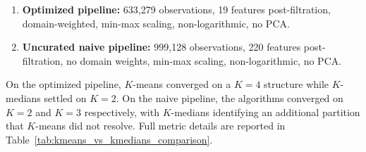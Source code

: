 \begin{enumerate}
    \item \textbf{Optimized pipeline:} 633,279 observations, 19 features post-filtration, domain-weighted, min-max scaling, non-logarithmic, no PCA.
    \item \textbf{Uncurated naive pipeline:} 999,128 observations, 220 features post-filtration, no domain weights, min-max scaling, non-logarithmic, no PCA.
\end{enumerate}

On the optimized pipeline, $K$-means converged on a $K=4$ structure while $K$-medians settled on $K=2$.
On the naive pipeline, the algorithms converged on $K=2$ and $K=3$ respectively, with $K$-medians identifying an additional partition that $K$-means did not resolve.
Full metric details are reported in Table~\ref{tab:kmeans_vs_kmedians_comparison}.

\begin{table}[H]
    \centering
    \renewcommand{\arraystretch}{1.3}
    \caption{$K$-means versus $K$-medians clustering performance on the optimized pipeline (active 633,279 observations, 19 features, domain-weighted, min-max scaling, non-logarithmic, no PCA) and the uncurated naive pipeline (full 999,128 observations, 220 features, no domain weights, min-max scaling, non-logarithmic, no PCA).}
    \label{tab:kmeans_vs_kmedians_comparison}
\end{table}

